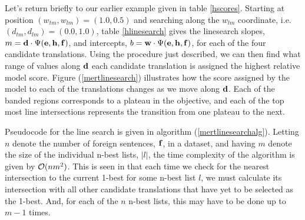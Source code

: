 \documentclass[11pt]{article}
\begin{document}
Let's return briefly to our earlier example given in table \ref{hscores}. Starting at position \mbox{$(w_{tm}, w_{lm}) = (1.0, 0.5)$} and searching along the \mbox{$w_{lm}$} coordinate, i.e. \mbox{$(d_{tm}, d_{lm}) = (0.0, 1.0)$}, table \ref{hlinesearch} gives the linesearch slopes, \mbox{$m = {\bf d} \cdot \Psi({\bf e}, {\bf h}, {\bf f})$}, and intercepts, \mbox{$b = {\bf w} \cdot \Psi({\bf e}, {\bf h}, {\bf f})$}, for each of the four candidate translations. Using the procedure just described, we can then find what range of values along \mbox{${\bf d}$} each candidate translation is assigned the highest relative model score.  Figure (\ref{mertlinesearch}) illustrates how the score assigned by the model to each of the translations changes as we move along \mbox{${\bf d}$}. Each of the banded regions corresponds to a plateau in the objective, and each of the top most line intersections represents the transition from one plateau to the next. 

Pseudocode for the line search is given in algorithm (\ref{mertlinesearchalg}). Letting \mbox{$n$} denote the number of foreign sentences, \mbox{${\bf f}$}, in a dataset, and having \mbox{$m$} denote the size of the individual n-best lists, \mbox{$|l|$}, the time complexity of the algorithm is given by \mbox{${\cal O}(n m^2)$}. This is seen in that each time we check for the nearest intersection to the current 1-best for some n-best list \mbox{$l$}, we must calculate its intersection with all other candidate translations that have yet to be selected as the 1-best. And, for each of the \mbox{$n$} n-best lists, this may have to be done up to \mbox{$m-1$} times. 

    
\end{document}

